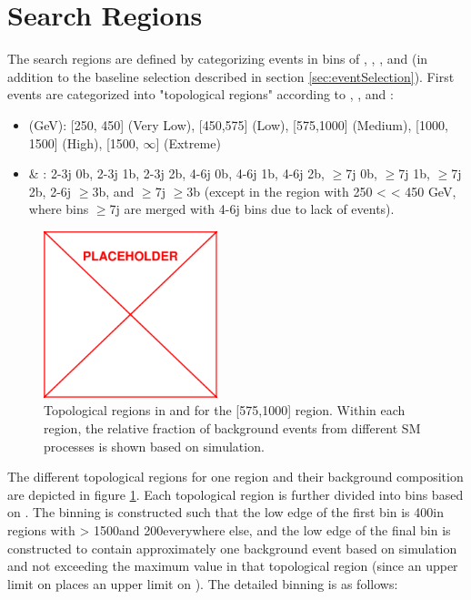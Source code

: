 \section{Search Regions}
\label{sec:searchRegions}
The search regions are defined by categorizing events in bins of \HT, \nj, \nb, and \mttwo (in addition to the baseline selection described in section \ref{sec:eventSelection}). First events are categorized into "topological regions" according to \HT, \nj, and \nb:
\begin{itemize}
	\item \HT (GeV): [250, 450] (Very Low), [450,575] (Low), [575,1000] (Medium), [1000, 1500] (High), [1500, $\infty$] (Extreme)
	\item \nj \& \nb: 2-3j 0b, 2-3j 1b, 2-3j 2b, 4-6j 0b, 4-6j 1b, 4-6j 2b, $\geq$7j 0b, $\geq$7j 1b, $\geq$7j 2b, 2-6j $\geq$3b, and $\geq$7j $\geq$3b (except in the region with 250 < \HT < 450 GeV, where bins $\geq$7j are merged with 4-6j bins due to lack of events).
\end{itemize}
\begin{figure}
	\centering
	\includegraphics[width=0.45\textwidth]{figs/placeholder}
	\caption{Topological regions in \nj and \nb for the [575,1000] \HT region. Within each region, the relative fraction of background events from different SM processes is shown based on simulation.}
	\label{fig:topologicalRegions}
\end{figure}
The different topological regions for one \HT region and their background composition are depicted in figure \ref{fig:topologicalRegions}. Each topological region is further divided into bins based on \mttwo. The \mttwo binning is constructed such that the low edge of the first bin is 400\GeV in regions with \HT > 1500\GeV and 200\GeV everywhere else, and the low edge of the final bin is constructed to contain approximately one background event based on simulation and not exceeding the maximum \HT value in that topological region (since an upper limit on \HT places an upper limit on \mttwo). The detailed \mttwo binning is as follows:

